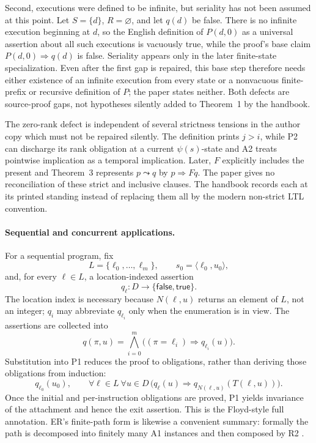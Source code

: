Second, executions were defined to be infinite, but seriality has not been
assumed at this point.  Let \(S=\{d\}\), \(R=\varnothing\), and let \(q(d)\)
be false.  There is no infinite execution beginning at \(d\), so the English
definition of \(P(d,0)\) as a universal assertion about all such executions is
vacuously true, while the proof's base claim
\(P(d,0)\Rightarrow q(d)\) is false.  Seriality appears only in the later
finite-state specialization.  Even after the first gap is repaired, this base
step therefore needs either existence of an infinite execution from every
state or a nonvacuous finite-prefix or recursive definition of \(P\); the paper
states neither.  Both defects are source-proof gaps, not hypotheses silently
added to Theorem~1 by the handbook.

The zero-rank defect is independent of several strictness tensions in the
author copy which must not be repaired silently.  The definition prints
\(j>i\), while P2 can discharge
its rank obligation at a current \(\psi(s)\)-state and A2 treats pointwise
implication as a temporal implication.  Later, \(F\) explicitly includes the
present and Theorem~3 represents \(p\leadsto q\) by \(p\Rightarrow Fq\).
The paper gives no reconciliation of these strict and inclusive clauses.  The
handbook records each at its printed standing instead of replacing them all by
the modern non-strict LTL convention.

\paragraph{Sequential and concurrent applications.}
For a sequential program, fix
\[
 L=\{\ell_0,\ldots,\ell_m\},
 \qquad s_0=\langle\ell_0,u_0\rangle,
\]
and, for every \(\ell\in L\), a location-indexed assertion
\[
 q_\ell:D\longrightarrow
   \{\mathsf{false},\mathsf{true}\}.
\]
The location index is necessary because \(N(\ell,u)\) returns an element of
\(L\), not an integer; \(q_i\) may abbreviate \(q_{\ell_i}\) only when the
enumeration is in view.  The assertions are collected into
\[
 q(\pi,u)=
 \bigwedge_{i=0}^{m}
  \bigl((\pi=\ell_i)\Rightarrow q_{\ell_i}(u)\bigr).
\]
Substitution into P1 reduces the proof to obligations, rather than deriving
those obligations from induction:
\[
 q_{\ell_0}(u_0),
 \qquad
 \forall\ell\in L\ \forall u\in D\,
 \bigl(q_\ell(u)\Rightarrow
       q_{N(\ell,u)}(T(\ell,u))\bigr).
\]
Once the initial and per-instruction obligations are proved, P1 yields
invariance of the attachment and hence the exit assertion.  This is the
Floyd-style full annotation.  ER's finite-path form is likewise a convenient
summary: formally the path is decomposed into finitely many A1 instances and
then composed by R2
\cite[p.~50]{Pnueli1977}.

